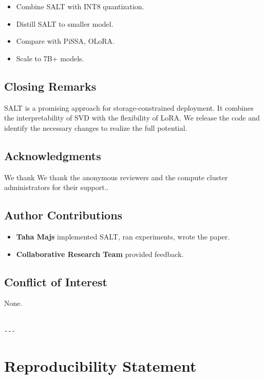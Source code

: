 \begin{itemize}
\item Combine SALT with INT8 quantization.
\item Distill SALT to smaller model.
\item Compare with PiSSA, OLoRA.
\item Scale to 7B+ models.

\end{itemize}
\subsection{Closing Remarks}

SALT is a promising approach for storage-constrained deployment. It combines 
the interpretability of SVD with the flexibility of LoRA. We release the 
code and identify the necessary changes to realize the full potential.

\subsection{Acknowledgments}

We thank We thank the anonymous reviewers and the compute cluster administrators for their support..

\subsection{Author Contributions}

\begin{itemize}
\item \textbf{Taha Majs} implemented SALT, ran experiments, wrote the paper.
\item \textbf{Collaborative Research Team} provided feedback.

\end{itemize}
\subsection{Conflict of Interest}

None.
\begin{lstlisting}

---
\end{lstlisting}


\section{Reproducibility Statement}

